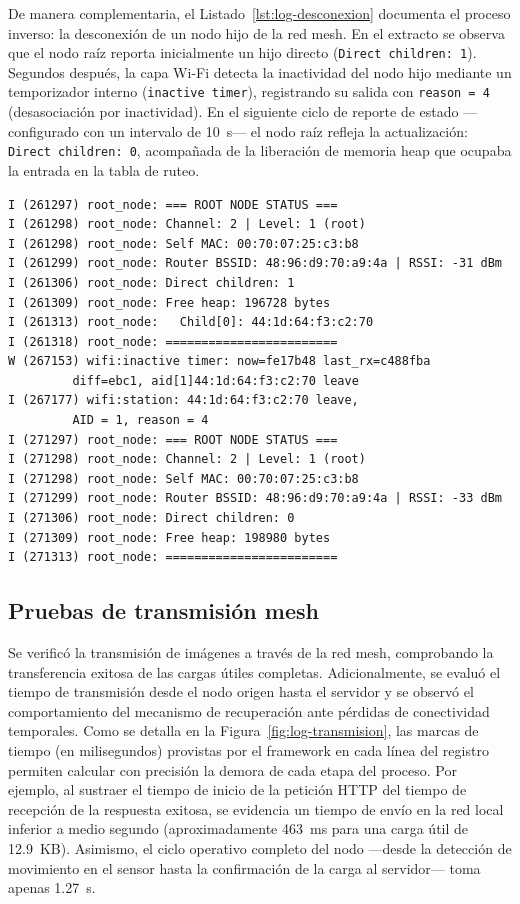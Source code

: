 \documentclass[a4paper, 12pt]{report}
\begin{document}
De manera complementaria, el Listado~\ref{lst:log-desconexion} documenta el proceso inverso: la desconexión de un nodo hijo de la red mesh. En el extracto se observa que el nodo raíz reporta inicialmente un hijo directo (\texttt{Direct children: 1}). Segundos después, la capa Wi-Fi detecta la inactividad del nodo hijo mediante un temporizador interno (\texttt{inactive timer}), registrando su salida con \texttt{reason = 4} (desasociación por inactividad). En el siguiente ciclo de reporte de estado ---configurado con un intervalo de \qty{10}{s}--- el nodo raíz refleja la actualización: \texttt{Direct children: 0}, acompañada de la liberación de memoria heap que ocupaba la entrada en la tabla de ruteo.

\begin{lstlisting}[caption={Registro de consola mostrando la desconexión de un nodo de la red mesh.}, label=lst:log-desconexion, numbers=none, basicstyle=\ttfamily\scriptsize]
I (261297) root_node: === ROOT NODE STATUS ===
I (261298) root_node: Channel: 2 | Level: 1 (root)
I (261298) root_node: Self MAC: 00:70:07:25:c3:b8
I (261299) root_node: Router BSSID: 48:96:d9:70:a9:4a | RSSI: -31 dBm
I (261306) root_node: Direct children: 1
I (261309) root_node: Free heap: 196728 bytes
I (261313) root_node:   Child[0]: 44:1d:64:f3:c2:70
I (261318) root_node: ========================
W (267153) wifi:inactive timer: now=fe17b48 last_rx=c488fba
         diff=ebc1, aid[1]44:1d:64:f3:c2:70 leave
I (267177) wifi:station: 44:1d:64:f3:c2:70 leave,
         AID = 1, reason = 4
I (271297) root_node: === ROOT NODE STATUS ===
I (271298) root_node: Channel: 2 | Level: 1 (root)
I (271298) root_node: Self MAC: 00:70:07:25:c3:b8
I (271299) root_node: Router BSSID: 48:96:d9:70:a9:4a | RSSI: -33 dBm
I (271306) root_node: Direct children: 0
I (271309) root_node: Free heap: 198980 bytes
I (271313) root_node: ========================
\end{lstlisting}

\subsection{Pruebas de transmisión mesh}

Se verificó la transmisión de imágenes a través de la red \gls{mesh}, comprobando la transferencia exitosa de las cargas útiles completas. Adicionalmente, se evaluó el tiempo de transmisión desde el nodo origen hasta el servidor y se observó el comportamiento del mecanismo de recuperación ante pérdidas de conectividad temporales. Como se detalla en la Figura~\ref{fig:log-transmision}, las marcas de tiempo (en milisegundos) provistas por el framework en cada línea del registro permiten calcular con precisión la demora de cada etapa del proceso. Por ejemplo, al sustraer el tiempo de inicio de la petición HTTP del tiempo de recepción de la respuesta exitosa, se evidencia un tiempo de envío en la red local inferior a medio segundo (aproximadamente \qty{463}{ms} para una carga útil de \qty{12.9}{KB}). Asimismo, el ciclo operativo completo del nodo —desde la detección de movimiento en el sensor hasta la confirmación de la carga al servidor— toma apenas \qty{1.27}{s}.
\end{document}
